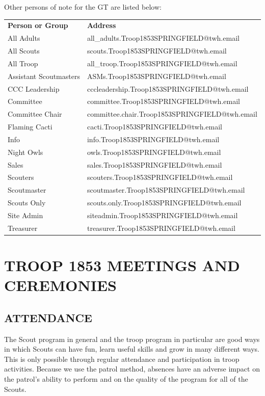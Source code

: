 \documentclass{ltxguide}
\begin{document}
Other persons of note for the \ac{GT} are listed below:

\begin{tabular}{ l l }
	\hline
	\textbf{Person or Group} & \textbf{Address} \\
	All Adults 						& all\_adults.Troop1853SPRINGFIELD@twh.email \\
	All Scouts 						& scouts.Troop1853SPRINGFIELD@twh.email \\
	All Troop 						& all\_troop.Troop1853SPRINGFIELD@twh.email \\
	Assistant Scoutmasters			& ASMs.Troop1853SPRINGFIELD@twh.email \\
	CCC Leadership 					& cccleadership.Troop1853SPRINGFIELD@twh.email \\
	Committee 						& committee.Troop1853SPRINGFIELD@twh.email \\
	Committee Chair 				& committee.chair.Troop1853SPRINGFIELD@twh.email \\
	Flaming Cacti 					& cacti.Troop1853SPRINGFIELD@twh.email \\
	Info 							& info.Troop1853SPRINGFIELD@twh.email \\
	Night Owls 						& owls.Troop1853SPRINGFIELD@twh.email \\
	Sales 							& sales.Troop1853SPRINGFIELD@twh.email \\
	Scouters 						& scouters.Troop1853SPRINGFIELD@twh.email \\
	Scoutmaster 					& scoutmaster.Troop1853SPRINGFIELD@twh.email \\
	Scouts Only 					& scouts.only.Troop1853SPRINGFIELD@twh.email \\
	Site Admin 						& siteadmin.Troop1853SPRINGFIELD@twh.email \\
	Treasurer 						& treasurer.Troop1853SPRINGFIELD@twh.email \\
	\hline
\end{tabular}


\section{TROOP 1853 MEETINGS AND CEREMONIES}
\label{TROOP MEETINGS}

\subsection{ATTENDANCE}
The Scout program in general and the troop program in particular are good ways in which Scouts can have fun, learn useful skills and grow in many different ways. This is only possible through regular attendance and participation in troop activities. Because we use the patrol method, absences have an adverse impact on the patrol's ability to perform and on the quality of the program for all of the Scouts.
\end{document}
